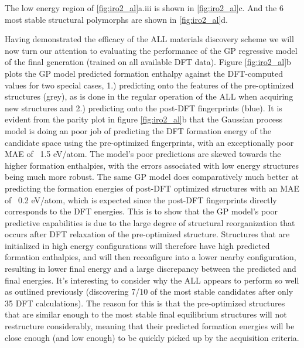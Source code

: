%
The low energy region of \ref{fig:iro2_al}a.iii is shown in \ref{fig:iro2_al}c.
%
And the 6 most stable structural polymorphs are shown in \ref{fig:iro2_al}d.


Having demonstrated the efficacy of the ALL materials discovery scheme we will now turn our attention to evaluating the performance of the GP regressive model of the final generation (trained on all available \IrOthree DFT data).
%
Figure \ref{fig:iro2_al}b plots the GP model predicted formation enthalpy against the DFT-computed values for two special cases,
1.) predicting onto the features of the pre-optimized structures (grey), as is done in the regular operation of the ALL when acquiring new structures and
2.) predicting onto the post-DFT fingerprints (blue).
%
It is evident from the parity plot in figure \ref{fig:iro2_al}b that the Gaussian process model is doing an poor job of predicting the DFT formation energy of the candidate space using the pre-optimized fingerprints,
with an exceptionally poor MAE of ~1.5 eV/atom.
%
The model's poor predictions are skewed towards the higher formation enthalpies, with the errors associated with low energy structures being much more robust.
%
The same GP model does comparatively much better at predicting the formation energies of post-DFT optimized structures with an MAE of ~0.2 eV/atom,
which is expected since the post-DFT fingerprints directly corresponds to the DFT energies.
%
This is to show that the GP model's poor predictive capabilities is due to the large degree of structural reorganization that occurs after DFT relaxation of the pre-optimized structure.
%
Structures that are initialized in high energy configurations will therefore have high predicted formation enthalpies, and will then reconfigure into a lower nearby configuration, resulting in lower final energy and a large discrepancy between the predicted and final energies.
%
It's interesting to consider why the ALL appears to perform so well as outlined previously (discovering 7/10 of the most stable candidates after only 35 DFT calculations).
%
The reason for this is that the pre-optimized structures that are similar enough to the most stable final equilibrium structures will not restructure considerably, meaning that their predicted formation energies will be close enough (and low enough) to be quickly picked up by the acquisition criteria.
%



